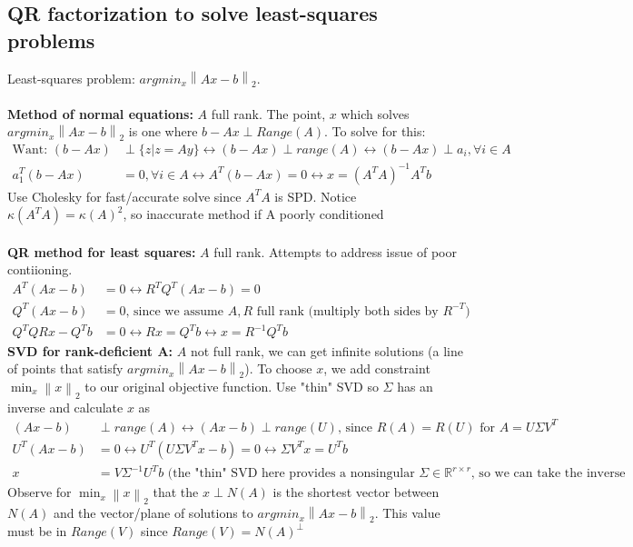 \documentclass{article}
\newcommand{\norm}[2]{\left\lVert#1\right\rVert_#2}
\begin{document}
\subsection{QR factorization to solve least-squares problems}
Least-squares problem: $argmin_x\norm{Ax - b}{2}$. \\\\
\textbf{Method of normal equations:} $A$ full rank. The point, $x$ which solves $argmin_x\norm{Ax - b}{2}$ is one where $b-Ax \perp Range(A)$. To solve for this:
\begin{align*}
    \textrm{Want: } (b-Ax) &\perp \{z \vert z = Ay\} \longleftrightarrow (b-Ax) \perp range(A) \longleftrightarrow (b-Ax) \perp a_i, \forall i \in A\\
    a_1^T(b-Ax) &= 0, \forall i \in A \longleftrightarrow A^T(b-Ax) = 0 \longleftrightarrow x = (A^TA)^{-1}A^Tb
\end{align*}
Use Cholesky for fast/accurate solve since $A^TA$ is SPD. Notice $\kappa(A^TA) = \kappa(A)^2$, so inaccurate method if A poorly conditioned\\\\
\textbf{QR method for least squares:} $A$ full rank. Attempts to address issue of poor contiioning. 
\begin{align*}
    A^T(Ax-b) &= 0 \longleftrightarrow R^TQ^T(Ax-b) = 0\\
    Q^T(Ax-b) &= 0 \textrm{, since we assume $A, R$ full rank (multiply both sides by $R^{-T}$})\\
    Q^TQRx-Q^Tb &= 0 \longleftrightarrow Rx = Q^Tb \longleftrightarrow x = R^{-1}Q^Tb
\end{align*}
\textbf{SVD for rank-deficient A: } $A$ not full rank, we can get infinite solutions (a line of points that satisfy $argmin_x\norm{Ax - b}{2}$). To choose $x$, we add constraint $\min_x \norm{x}{2}$ to our original objective function. Use "thin" SVD so $\Sigma$ has an inverse and calculate $x$ as
\begin{align*}
    (Ax-b) &\perp range(A) \longleftrightarrow (Ax-b) \perp range(U) \textrm{, since $R(A) = R(U)$ for $A=U\Sigma V^T$}\\
    U^T(Ax-b) &= 0 \longleftrightarrow U^T(U\Sigma V^Tx - b) = 0 \longleftrightarrow \Sigma V^Tx = U^Tb\\ 
    x &= V\Sigma^{-1}U^Tb \textrm{ (the "thin" SVD here provides a nonsingular $\Sigma\in \mathbb{R}^{r \times r}$, so we can take the inverse}
\end{align*}
Observe for $\min_x \norm{x}{2}$ that the $x \perp N(A)$ is the shortest vector between $N(A)$ and the vector/plane of solutions to $argmin_x\norm{Ax - b}{2}$. This value must be in $Range(V)$ since $Range(V) = N(A)^\perp$
\end{document}

